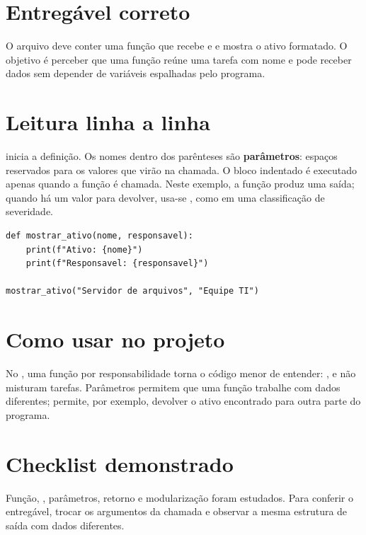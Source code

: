 \documentclass[11pt,a4paper]{article}
\begin{document}
\section*{Entregável correto}
O arquivo deve conter uma função que recebe  e  e mostra o ativo formatado. O objetivo é perceber que uma função reúne uma tarefa com nome e pode receber dados sem depender de variáveis espalhadas pelo programa.
\section*{Leitura linha a linha}
 inicia a definição. Os nomes dentro dos parênteses são \textbf{parâmetros}: espaços reservados para os valores que virão na chamada. O bloco indentado é executado apenas quando a função é chamada. Neste exemplo, a função produz uma saída; quando há um valor para devolver, usa-se , como em uma classificação de severidade.
\begin{lstlisting}
def mostrar_ativo(nome, responsavel):
    print(f"Ativo: {nome}")
    print(f"Responsavel: {responsavel}")

mostrar_ativo("Servidor de arquivos", "Equipe TI")
\end{lstlisting}
\section*{Como usar no projeto}
No , uma função por responsabilidade torna o código menor de entender: ,  e  não misturam tarefas. Parâmetros permitem que uma função trabalhe com dados diferentes;  permite, por exemplo, devolver o ativo encontrado para outra parte do programa.
\section*{Checklist demonstrado}
Função, , parâmetros, retorno e modularização foram estudados. Para conferir o entregável, trocar os argumentos da chamada e observar a mesma estrutura de saída com dados diferentes.
\end{document}
